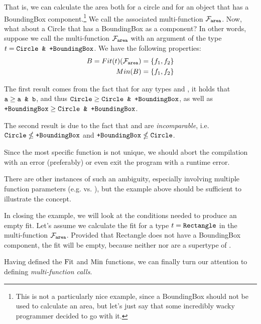 \noindent That is, we can calculate the area both for a circle and for an object that has a BoundingBox component.\footnote{This is not a particularly nice example, since a BoundingBox should not be used to calculate an area, but let's just say that some incredibly wacky programmer decided to go with it.} We call the associated multi-function $\mathcal{F}_{\text{\texttt{area}}}$. Now, what about a Circle that has a BoundingBox as a component? In other words, suppose we call the multi-function $\mathcal{F}_{\text{\texttt{area}}}$ with an argument of the type $t = \texttt{Circle \& +BoundingBox}$. We have the following properties:
\begin{align*}
	B = Fit(t)(\mathcal{F}_{\text{\texttt{area}}}) &= \{ f_1, f_2 \} \\
	Min(B) &= \{ f_1, f_2 \}
\end{align*}
	
\noindent The first result comes from the fact that for any types  and , it holds that $\texttt{a} \geq \texttt{a \& b}$, and thus $\texttt{Circle} \geq \texttt{Circle \& +BoundingBox}$, as well as $\texttt{+BoundingBox} \geq \texttt{Circle \& +BoundingBox}$.
	
The second result is due to the fact that  and  are \textit{incomparable}, i.e. $\texttt{Circle} \nleq \texttt{+BoundingBox}$ and $\texttt{+BoundingBox} \nleq \texttt{Circle}$.
	
Since the most specific function is not unique, we should abort the compilation with an error (preferably) or even exit the program with a runtime error.
	
There are other instances of such an ambiguity, especially involving multiple function parameters (e.g.  vs. ), but the example above should be sufficient to illustrate the concept.
	
\medskip
	
\noindent In closing the example, we will look at the conditions needed to produce an empty fit. Let's assume we calculate the fit for a type $t = \texttt{Rectangle}$ in the multi-function $\mathcal{F}_{\text{\texttt{area}}}$. Provided that Rectangle does not have a BoundingBox component, the fit will be empty, because neither  nor  are a supertype of .

\bigskip

\noindent Having defined the $\operatorname{Fit}$ and $\operatorname{Min}$ functions, we can finally turn our attention to defining \textit{multi-function calls}.

